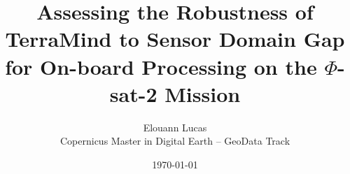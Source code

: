 \documentclass[12pt, a4paper]{report}
\title{Assessing the Robustness of TerraMind to Sensor Domain Gap for On-board Processing on the $\Phi$-sat-2 Mission}
\author{Elouann Lucas \\ Copernicus Master in Digital Earth -- GeoData Track}
\date{\today}
\begin{document}
\maketitle

\begin{abstract}

\end{abstract}

\tableofcontents
\newpage









\end{document}
